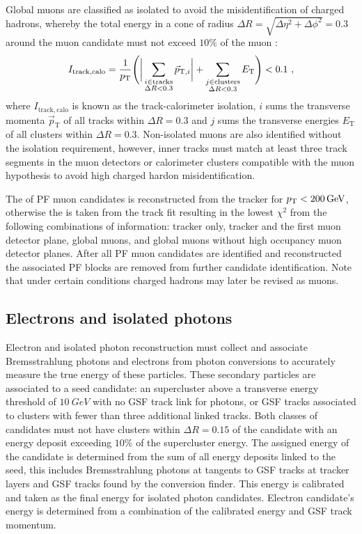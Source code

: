 Global muons are classified as isolated to avoid the misidentification of charged hadrons, whereby the total energy in a cone of radius ${\Delta R=\sqrt{\Delta\eta^2+\Delta\phi^2}=0.3}$ around the muon candidate must not exceed $10\%$ of the muon \pt:
%
\begin{equation}
    I_{\mathrm{track,calo}} = \frac{1}{\pt}\Biggl(\bigg|\sum_{\substack{i\in \mathrm{tracks}\\\Delta R<0.3}} \vec{p}_{\mathrm{T},i}\bigg| + \sum_{\substack{j\in \mathrm{clusters}\\\Delta R<0.3}}E_{\mathrm{T}}\Biggr) < 0.1\ ,
\end{equation}
%
where $I_{\mathrm{track,calo}}$ is known as the track-calorimeter isolation, $i$ sums the transverse momenta $\vec{p}_{\mathrm{T}}$ of all tracks within $\Delta R=0.3$ and $j$ sums the transverse energies $E_{\mathrm{T}}$ of all clusters within $\Delta R=0.3$.  Non-isolated muons are also identified without the isolation requirement, however, inner tracks must match at least three track segments in the muon detectors or calorimeter clusters compatible with the muon hypothesis to avoid high \pt charged hardon misidentification.

The \pt of PF muon candidates is reconstructed from the tracker for ${p_{\text{T}}<\SI{200}{GeV}}$, otherwise the \pt is taken from the track fit resulting in the lowest $\chi^2$ from the following combinations of information: tracker only, tracker and the first muon detector plane, global muons, and global muons without high occupancy muon detector planes. After all PF muon candidates are identified and reconstructed the associated PF blocks are removed from further candidate identification. Note that under certain conditions charged hadrons may later be revised as muons.


\subsection{Electrons and isolated photons}

Electron and isolated photon reconstruction must collect and associate Bremsstrahlung photons and electrons from photon conversions to accurately measure the true energy of these particles. These secondary particles are associated to a seed candidate: an \ECAL supercluster above a transverse energy threshold of ${\SI{10}{GeV}}$ with no GSF track link for photons, or GSF tracks associated to \ECAL clusters with fewer than three additional linked tracks. Both classes of candidates must not have \HCAL clusters within ${\Delta R=0.15}$ of the candidate with an energy deposit exceeding $10\%$ of the supercluster energy. The assigned energy of the candidate is determined from the sum of all energy deposits linked to the seed, this includes Bremsstrahlung photons at tangents to GSF tracks at tracker layers and GSF tracks found by the conversion finder. This energy is calibrated and taken as the final energy for isolated photon candidates. Electron candidate's energy is determined from a combination of the calibrated \ECAL energy and GSF track momentum.

